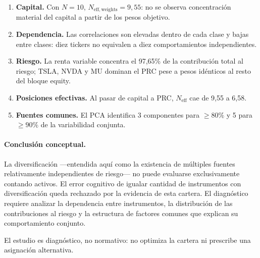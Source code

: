 \documentclass[12pt,letterpaper]{article}
\begin{document}
\begin{enumerate}
\item \textbf{Capital.} Con \(N=10\), \(N_{\mathrm{eff,weights}}=9{,}55\): no se observa concentración material del capital a partir de los pesos objetivo.
\item \textbf{Dependencia.} Las correlaciones son elevadas dentro de cada clase y bajas entre clases: diez tickers no equivalen a diez comportamientos independientes.
\item \textbf{Riesgo.} La renta variable concentra el 97{,}65\% de la contribución total al riesgo; TSLA, NVDA y MU dominan el PRC pese a pesos idénticos al resto del bloque equity.
\item \textbf{Posiciones efectivas.} Al pasar de capital a PRC, \(N_{\mathrm{eff}}\) cae de 9{,}55 a 6{,}58.
\item \textbf{Fuentes comunes.} El PCA identifica 3 componentes para \(\ge 80\%\) y 5 para \(\ge 90\%\) de la variabilidad conjunta.
\end{enumerate}

\paragraph{Conclusión conceptual.}
La diversificación ---entendida aquí como la existencia de múltiples fuentes relativamente independientes de riesgo--- no puede evaluarse exclusivamente contando activos. El error cognitivo de igualar cantidad de instrumentos con diversificación queda rechazado por la evidencia de esta cartera. El diagnóstico requiere analizar la dependencia entre instrumentos, la distribución de las contribuciones al riesgo y la estructura de factores comunes que explican su comportamiento conjunto.

El estudio es diagnóstico, no normativo: no optimiza la cartera ni prescribe una asignación alternativa.
\end{document}
